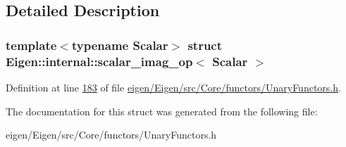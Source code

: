 \subsection{Detailed Description}
\subsubsection*{template$<$typename Scalar$>$\newline
struct Eigen\+::internal\+::scalar\+\_\+imag\+\_\+op$<$ Scalar $>$}



Definition at line \hyperlink{eigen_2_eigen_2src_2_core_2functors_2_unary_functors_8h_source_l00183}{183} of file \hyperlink{eigen_2_eigen_2src_2_core_2functors_2_unary_functors_8h_source}{eigen/\+Eigen/src/\+Core/functors/\+Unary\+Functors.\+h}.



The documentation for this struct was generated from the following file\+:\begin{DoxyCompactItemize}
\item 
eigen/\+Eigen/src/\+Core/functors/\+Unary\+Functors.\+h\end{DoxyCompactItemize}
